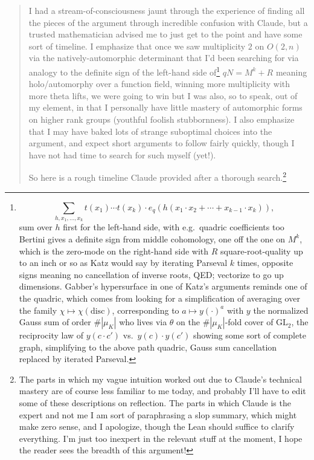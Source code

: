 \documentclass[11pt]{amsbook}
\theoremstyle{plain}
\theoremstyle{definition}
\theoremstyle{remark}
\numberwithin{equation}{section}
\numberwithin{figure}{chapter}
\numberwithin{table}{chapter}
\begin{document}
\begin{quotation}
I had a stream-of-consciousness jaunt through the experience of finding all
the pieces of the argument through incredible confusion with Claude, but a
trusted mathematician advised me to just get to the point and have some sort
of timeline. I emphasize that once we saw multiplicity $2$ on $O(2,n)$ via
the \remarkdq natively-automorphic\remarkdq{} determinant that I'd been
searching for via analogy to the definite sign of the left-hand side
of\footnote{%
\[
  \sum_{h,x_1,\ldots,x_k} t(x_1)\cdots t(x_k)\cdot
  e_q\left(h\left(x_1\cdot x_2+\cdots+x_{k-1}\cdot x_k\right)\right),
\]
sum over $h$ first for the left-hand side, with e.g.\ quadric coefficients
too Bertini gives a definite sign from middle cohomology, one off the one on
$M^k$, which is the zero-mode on the right-hand side with $R$
square-root-quality up to an inch or so as Katz would say by iterating
Parseval $k$ times, opposite signs meaning no cancellation of inverse roots,
QED; vectorize to go up dimensions. Gabber's hypersurface in one of Katz's
arguments reminds one of the quadric, which comes from looking for a
simplification of averaging over the family
$\chi\mapsto\chi(\mathrm{disc})$, corresponding to $a\mapsto y(\cdot)^a$
with $y$ the normalized Gauss sum of order $\#|\mu_K|$ who lives via
$\theta$ on the $\#|\mu_K|$-fold cover of $\mathrm{GL}_2$, the reciprocity
law of $y(c\cdot c')$ vs.\ $y(c)\cdot y(c')$ showing some sort of complete
graph, simplifying to the above \remarkdq path\remarkdq{} quadric, Gauss sum
cancellation replaced by iterated Parseval.}
$qN = M^k + R$ meaning holo/automorphy over a function field, winning more
multiplicity with more theta lifts, we were going to win but I was also, so
to speak, out of my element, in that I personally have little mastery of
automorphic forms on higher rank groups (youthful foolish stubbornness). I
also emphasize that I may have baked lots of strange suboptimal choices into
the argument, and expect short arguments to follow fairly quickly, though I
have not had time to search for such myself (yet!).

So here is a rough timeline Claude provided after a thorough
search.\footnote{The parts in which my vague intuition worked out due to
Claude's technical mastery are of course less familiar to me today, and
probably I'll have to edit some of these descriptions on reflection. The
parts in which Claude is the expert and not me I am sort of paraphrasing a
\remarkdq slop\remarkdq{} summary, which might make zero sense, and I
apologize, though the Lean should suffice to clarify everything. I'm just too
inexpert in the relevant stuff at the moment, I hope the reader sees the
breadth of this argument!}


\end{quotation}
\end{document}
